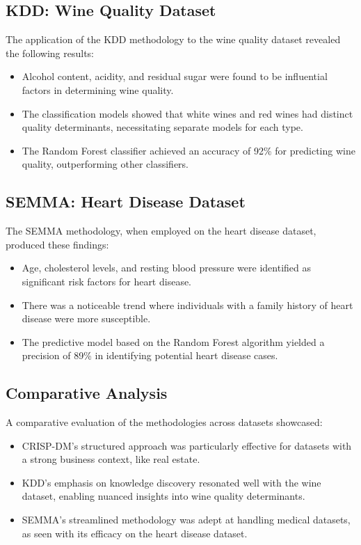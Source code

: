 \documentclass{article}
\begin{document}
\subsection{KDD: Wine Quality Dataset}
The application of the KDD methodology to the wine quality dataset revealed the following results:

\begin{itemize}
    \item Alcohol content, acidity, and residual sugar were found to be influential factors in determining wine quality.
    \item The classification models showed that white wines and red wines had distinct quality determinants, necessitating separate models for each type.
    \item The Random Forest classifier achieved an accuracy of 92\% for predicting wine quality, outperforming other classifiers.
\end{itemize}

\subsection{SEMMA: Heart Disease Dataset}
The SEMMA methodology, when employed on the heart disease dataset, produced these findings:

\begin{itemize}
    \item Age, cholesterol levels, and resting blood pressure were identified as significant risk factors for heart disease.
    \item There was a noticeable trend where individuals with a family history of heart disease were more susceptible.
    \item The predictive model based on the Random Forest algorithm yielded a precision of 89\% in identifying potential heart disease cases.
\end{itemize}

\subsection{Comparative Analysis}
A comparative evaluation of the methodologies across datasets showcased:

\begin{itemize}
    \item CRISP-DM's structured approach was particularly effective for datasets with a strong business context, like real estate.
    \item KDD's emphasis on knowledge discovery resonated well with the wine dataset, enabling nuanced insights into wine quality determinants.
    \item SEMMA's streamlined methodology was adept at handling medical datasets, as seen with its efficacy on the heart disease dataset.
\end{itemize}
\end{document}
